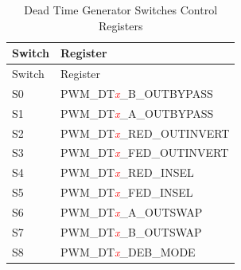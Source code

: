 \begin{longtable}[c]{ |p{4cm}|p{6cm}| }
    \caption{Dead Time Generator Switches Control Registers}
    \label{table:s_dt}
    \\\hline
    \rowcolor{lightgray}
    Switch
    & Register
    \\\hline
    \endfirsthead
    \hline
    \rowcolor{lightgray}   
    Switch
    & Register
    \\\hline
    \endhead
    \hline
    \endfoot
    S0
    & PWM\_DT\textcolor{red}{\it{x}}\_B\_OUTBYPASS
    \\\hline
    S1
    & PWM\_DT\textcolor{red}{\it{x}}\_A\_OUTBYPASS
    \\\hline
    S2
    & PWM\_DT\textcolor{red}{\it{x}}\_RED\_OUTINVERT
    \\\hline
    S3
    & PWM\_DT\textcolor{red}{\it{x}}\_FED\_OUTINVERT
    \\\hline
    S4
    & PWM\_DT\textcolor{red}{\it{x}}\_RED\_INSEL
    \\\hline
    S5
    & PWM\_DT\textcolor{red}{\it{x}}\_FED\_INSEL
    \\\hline
    S6
    & PWM\_DT\textcolor{red}{\it{x}}\_A\_OUTSWAP
    \\\hline
    S7
    & PWM\_DT\textcolor{red}{\it{x}}\_B\_OUTSWAP
    \\\hline
    S8
    & PWM\_DT\textcolor{red}{\it{x}}\_DEB\_MODE
    \\\hline
\end{longtable}